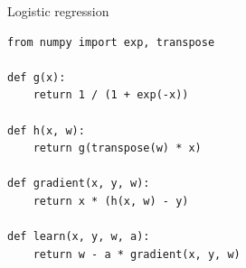 \begin{frame}[fragile]
  \begin{block}{Logistic regression}
    \begin{lstlisting}
from numpy import exp, transpose

def g(x):
    return 1 / (1 + exp(-x))

def h(x, w):
    return g(transpose(w) * x)

def gradient(x, y, w):
    return x * (h(x, w) - y)

def learn(x, y, w, a):
    return w - a * gradient(x, y, w)
    \end{lstlisting}
  \end{block}
\end{frame}
